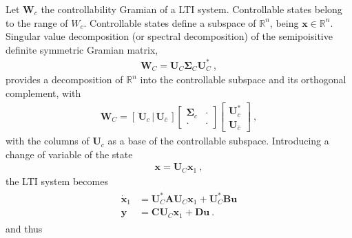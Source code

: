 \documentclass[letterpaper,10pt,english]{jupyterBook}
\begin{document}
\sphinxAtStartPar
Let \(\mathbf{W}_c\) the controllability Gramian of a LTI system. Controllable states belong to the range of \(W_c\). Controllable states define a sub\sphinxhyphen{}space of \(\mathbb{R}^n\), being \(\mathbf{x} \in \mathbb{R}^n\). Singular value decomposition (or spectral decomposition) of the semi\sphinxhyphen{}poisitive definite symmetric Gramian matrix,
\begin{equation*}
\begin{split}\mathbf{W}_C = \mathbf{U}_C \boldsymbol\Sigma_C \mathbf{U}_C^* \ ,\end{split}
\end{equation*}
\sphinxAtStartPar
provides a decomposition of \(\mathbb{R}^n\) into the controllable sub\sphinxhyphen{}space and its orthogonal complement, with
\begin{equation*}
\begin{split}\mathbf{W}_C = [ \, \mathbf{U}_c \, | \, \mathbf{U}_{\overline{c}} \, ] \begin{bmatrix} \boldsymbol\Sigma_c & \cdot \\ \cdot & \cdot \end{bmatrix} \begin{bmatrix} \mathbf{U}_c^* \\ \mathbf{U}_{\overline{c}} \end{bmatrix} \ ,\end{split}
\end{equation*}
\sphinxAtStartPar
with the columns of \(\mathbf{U}_c\) as a base of the controllable sub\sphinxhyphen{}space. Introducing a change of variable of the state
\begin{equation*}
\begin{split}\mathbf{x} = \mathbf{U}_C \mathbf{x}_1 \ ,\end{split}
\end{equation*}
\sphinxAtStartPar
the LTI system becomes
\begin{equation*}
\begin{split}\begin{aligned}
  \dot{\mathbf{x}}_1 & = \mathbf{U}_C^* \mathbf{A} \mathbf{U}_C \mathbf{x}_1 + \mathbf{U}_C^* \mathbf{B} \mathbf{u} \\
       \mathbf{y}    & = \mathbf{C} \mathbf{U}_C \mathbf{x}_1 + \mathbf{D} \mathbf{u} \ .
\end{aligned}\end{split}
\end{equation*}
\sphinxAtStartPar
and thus
\end{document}
